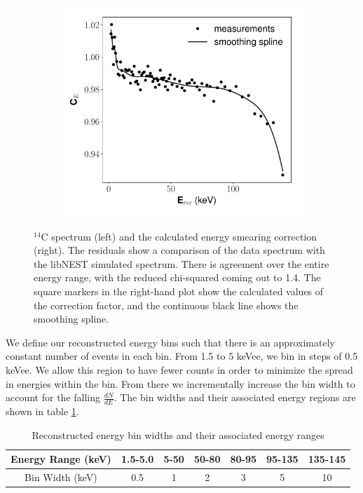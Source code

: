 \begin{figure}[h!]
\begin{subfigure}{0.5\textwidth}
  \includegraphics[width=\textwidth]{Figures/yields_corrections/C14_E_correction_gfdcm_180Vcm_prelim.pdf}
  \caption{}
  \label{fig:c14ecorr_180_prelim}
\end{subfigure}
\caption{$^{14}$C spectrum (left) and the calculated energy smearing correction (right). The residuals show a comparison of the data spectrum with the libNEST simulated spectrum. There is agreement over the entire energy range, with the reduced chi-squared coming out to 1.4. The square markers in the right-hand plot show the calculated values of the correction factor, and the continuous black line shows the smoothing spline.}
\label{fig:c14_ecorr}
\end{figure} 
We define our reconstructed energy bins such that there is an approximately constant number of events in each bin. From 1.5 to 5 keVee, we bin in steps of 0.5 keVee. We allow this region to have fewer counts in order to minimize the spread in energies within the bin. From there we incrementally increase the bin width to account for the falling $\frac{dN}{dE}$. The bin widths and their associated energy regions  are shown in table \ref{tab:ebins_C14}.
\begin{table}[h!]
\centering
    \begin{tabular}{ c || c | c | c | c | c | c  }
    \hline
    Energy Range (keV) & 1.5-5.0 & 5-50  & 50-80 & 80-95 & 95-135 & 135-145\\
    \hline
    Bin Width (keV)         &  0.5       & 1      & 2        & 3         & 5           & 10 \\
    \hline
    \end{tabular}
    \caption{Reconstructed energy bin widths and their associated energy ranges}
    \label{tab:ebins_C14}
\end{table}

